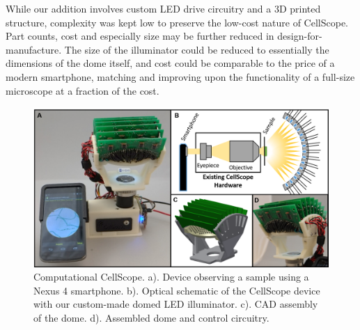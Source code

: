 While our addition involves custom LED drive circuitry and a 3D printed structure, complexity was kept low to preserve the low-cost nature of CellScope. Part counts, cost and especially size may be further reduced in design-for-manufacture. The size of the illuminator could be reduced to essentially the dimensions of the dome itself, and cost could be comparable to the price of a modern smartphone, matching and improving upon the functionality of a full-size microscope at a fraction of the cost.

\begin{figure} [ht]
\begin{center}
\includegraphics[width=\textwidth]{figures/fig_ccs_system.png}
\end{center}
\caption {{Computational CellScope.} {a).} Device observing a sample using a Nexus 4 smartphone. {b).} Optical schematic of the CellScope device with our custom-made domed LED illuminator. {c).} CAD assembly of the dome. {d).} Assembled dome and control circuitry.}
\label{fig:device}
\end{figure}

